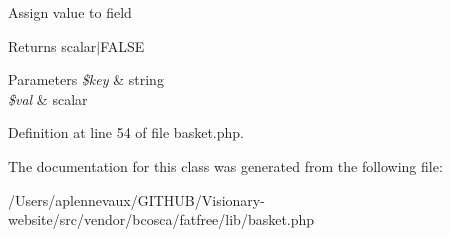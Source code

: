Assign value to field \begin{DoxyReturn}{Returns}
scalar$\vert$\+F\+A\+L\+SE 
\end{DoxyReturn}

\begin{DoxyParams}{Parameters}
{\em \$key} & string \\
\hline
{\em \$val} & scalar \\
\hline
\end{DoxyParams}


Definition at line 54 of file basket.\+php.



The documentation for this class was generated from the following file\+:\begin{DoxyCompactItemize}
\item 
/\+Users/aplennevaux/\+G\+I\+T\+H\+U\+B/\+Visionary-\/website/src/vendor/bcosca/fatfree/lib/basket.\+php\end{DoxyCompactItemize}
